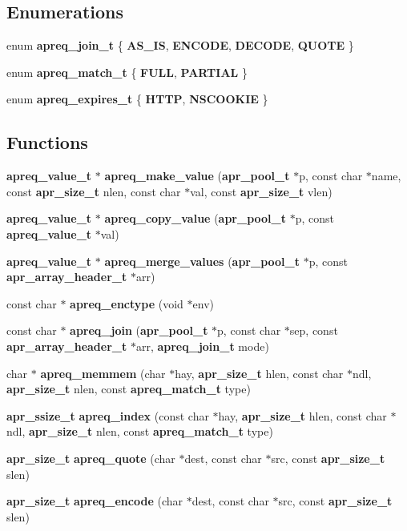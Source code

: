 \subsection*{Enumerations}
\begin{CompactItemize}
\item 
enum {\bf apreq\_\-join\_\-t} \{ {\bf AS\_\-IS}, 
{\bf ENCODE}, 
{\bf DECODE}, 
{\bf QUOTE}
 \}
\item 
enum {\bf apreq\_\-match\_\-t} \{ {\bf FULL}, 
{\bf PARTIAL}
 \}
\item 
enum {\bf apreq\_\-expires\_\-t} \{ {\bf HTTP}, 
{\bf NSCOOKIE}
 \}
\end{CompactItemize}
\subsection*{Functions}
\begin{CompactItemize}
\item 
{\bf apreq\_\-value\_\-t} $\ast$ {\bf apreq\_\-make\_\-value} ({\bf apr\_\-pool\_\-t} $\ast$p, const char $\ast$name, const {\bf apr\_\-size\_\-t} nlen, const char $\ast$val, const {\bf apr\_\-size\_\-t} vlen)
\item 
{\bf apreq\_\-value\_\-t} $\ast$ {\bf apreq\_\-copy\_\-value} ({\bf apr\_\-pool\_\-t} $\ast$p, const {\bf apreq\_\-value\_\-t} $\ast$val)
\item 
{\bf apreq\_\-value\_\-t} $\ast$ {\bf apreq\_\-merge\_\-values} ({\bf apr\_\-pool\_\-t} $\ast$p, const {\bf apr\_\-array\_\-header\_\-t} $\ast$arr)
\item 
const char $\ast$ {\bf apreq\_\-enctype} (void $\ast$env)
\item 
const char $\ast$ {\bf apreq\_\-join} ({\bf apr\_\-pool\_\-t} $\ast$p, const char $\ast$sep, const {\bf apr\_\-array\_\-header\_\-t} $\ast$arr, {\bf apreq\_\-join\_\-t} mode)
\item 
char $\ast$ {\bf apreq\_\-memmem} (char $\ast$hay, {\bf apr\_\-size\_\-t} hlen, const char $\ast$ndl, {\bf apr\_\-size\_\-t} nlen, const {\bf apreq\_\-match\_\-t} type)
\item 
{\bf apr\_\-ssize\_\-t} {\bf apreq\_\-index} (const char $\ast$hay, {\bf apr\_\-size\_\-t} hlen, const char $\ast$ndl, {\bf apr\_\-size\_\-t} nlen, const {\bf apreq\_\-match\_\-t} type)
\item 
{\bf apr\_\-size\_\-t} {\bf apreq\_\-quote} (char $\ast$dest, const char $\ast$src, const {\bf apr\_\-size\_\-t} slen)
\item 
{\bf apr\_\-size\_\-t} {\bf apreq\_\-encode} (char $\ast$dest, const char $\ast$src, const {\bf apr\_\-size\_\-t} slen)

\end{CompactItemize}
